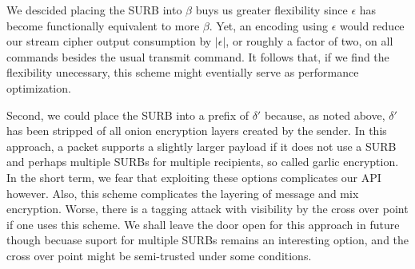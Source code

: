 We descided placing the SURB into $\beta$ buys us greater flexibility
since $\epsilon$ has become functionally equivalent to more $\beta$.  
Yet, an encoding using $\epsilon$ would reduce our stream cipher
output consumption by $|\epsilon|$, or roughly a factor of two,
on all commands besides the usual transmit command.  It follows that,
if we find the flexibility unecessary, this scheme might eventially
serve as performance optimization. 

Second, we could place the SURB into a prefix of $\delta'$ because,
as noted above, $\delta'$ has been stripped of all onion encryption
layers created by the sender.  In this approach, a packet supports
a slightly larger payload if it does not use a SURB and perhaps
multiple SURBs for multiple recipients, so called garlic encryption.
In the short term, we fear that exploiting these options complicates
our API however.  Also, this scheme complicates the layering of
message and mix encryption.  Worse, there is a tagging attack with
visibility by the cross over point if one uses this scheme.  We shall
leave the door open for this approach in future though becuase suport
for multiple SURBs remains an interesting option, and the cross over
point might be semi-trusted under some conditions.






